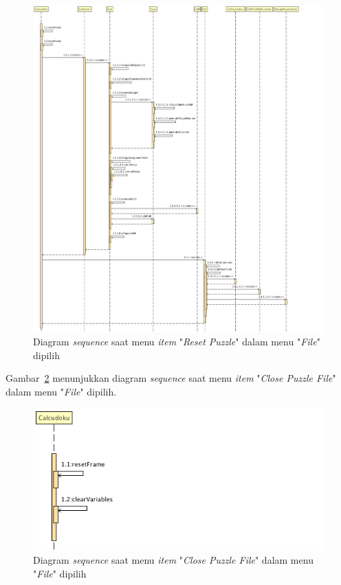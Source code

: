\begin{figure}
\centering
\captionsetup{justification=centering}
\includegraphics[scale=0.375]{Gambar/Analisis/SequenceDiagramReset.png}
\caption[Diagram \textit{sequence} saat menu \textit{item} "\textit{Reset Puzzle}" dalam menu "\textit{File}" dipilih]{Diagram \textit{sequence} saat menu \textit{item} "\textit{Reset Puzzle}" dalam menu "\textit{File}" dipilih}
\label{fig:sequencereset}
\end{figure}

Gambar~\ref{fig:sequenceclose} menunjukkan diagram \textit{sequence} saat menu \textit{item} "\textit{Close Puzzle File}" dalam menu "\textit{File}" dipilih.

\begin{figure}
\centering
\captionsetup{justification=centering}
\includegraphics[scale=0.5]{Gambar/Analisis/SequenceDiagramClose.png}
\caption[Diagram \textit{sequence} saat menu \textit{item} "\textit{Close Puzzle File}" dalam menu "\textit{File}" dipilih]{Diagram \textit{sequence} saat menu \textit{item} "\textit{Close Puzzle File}" dalam menu "\textit{File}" dipilih}
\label{fig:sequenceclose}
\end{figure}

